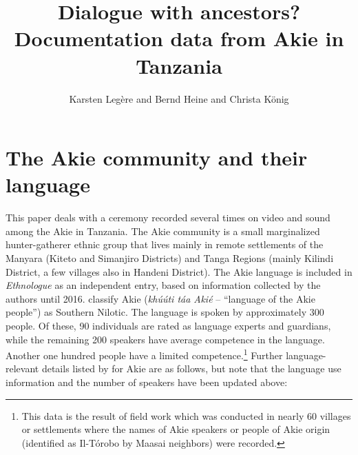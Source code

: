 \documentclass[output=paper,colorlinks,citecolor=brown]{langscibook}
\author{Karsten Legère\affiliation{University of Gothenburg} and Bernd Heine\affiliation{University of Cologne} and  Christa König\affiliation{Goethe University Frankfurt}}
\title{Dialogue with ancestors? Documentation data from Akie in Tanzania}
\begin{document}
\maketitle

\section{The Akie community and their language}\label{sec:legere:1}

This paper deals with a ceremony recorded several times on video and sound among the Akie in Tanzania. The Akie community is a small marginalized hunter-gatherer ethnic group that lives mainly in remote settlements of the Manyara (Kiteto and Simanjiro Districts) and Tanga Regions (mainly Kilindi District, a few villages also in Handeni District). The Akie language is included in \textit{Ethnologue} \citep{SimonsFennig2018}  as an independent entry, based on information collected by the authors until 2016. \citeauthor{SimonsFennig2018} classify Akie (\textit{khúúti táa Akié} – “language of the Akie people”) as Southern Nilotic. The language is spoken by approximately 300 people. Of these, 90 individuals are rated as language experts and guardians, while the remaining 200 speakers have average competence in the language. Another one hundred people have a limited competence.\footnote{This data is the result of field work which was conducted  in nearly 60 villages or settlements where the names of Akie speakers or people of Akie origin (identified as Il-Tórobo by Maasai neighbors) were recorded.} Further language-relevant details listed by \citeauthor{SimonsFennig2018} for Akie are as follows, but note that the language use information and the number of speakers have been updated above:
\end{document}
